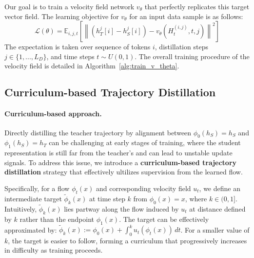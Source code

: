 \documentclass{article} %
\theoremstyle{definition}
\theoremstyle{remark}
\begin{document}
Our goal is to train a velocity field network $v_\theta$ that perfectly replicates this target vector field. The learning objective for $v_\theta$ for an input data sample is as follows:
\begin{equation}
\mathcal{L}(\theta) = \mathbb{E}_{i, j, t} \left[ \left\| \left(h_T^{j}[i] - h_S^{j}[i]\right) - v_\theta\left(H_t^{(i,j)}, t, j\right) \right\|^2 \right]
\end{equation}
The expectation is taken over sequence of tokens $i$, distillation steps $j \in \{1, ..., L_D\}$, and time steps $t \sim U(0,1)$. The overall training procedure of the velocity field is detailed in Algorithm~\ref{alg:train_v_theta}.
\subsection{Curriculum-based Trajectory Distillation}
\label{sec:distill}
\paragraph{Curriculum-based approach. }Directly distilling the teacher trajectory by alignment between $\phi_0(h_S) = h_S$ and $\phi_1(h_S) = h_T$ can be challenging at early stages of training, where the student representation is still far from the teacher's and can lead to unstable update signals. To address this issue, we introduce a \textbf{curriculum-based trajectory distillation} strategy that effectively ultilizes supervision from the learned flow.

Specifically, for a flow $\phi_t(x)$ and corresponding velocity field $u_t$, we define an intermediate target $\tilde{\phi}_k(x)$ at time step $k$ from $\phi_0(x) = x$, where $k \in (0, 1]$. Intuitively, $\tilde{\phi}_k(x)$ lies partway along the flow induced by $u_t$ at distance defined by $k$ rather than the endpoint $\phi_1(x)$. The target can be effectively approximated by: $\tilde{\phi}_k(x) := {\phi_0(x)} + \int_{0}^{k} u_t(\phi_t(x)) \, dt$. For a smaller value of $k$, the target is easier to follow, forming a curriculum that progressively increases in difficulty as training proceeds.
\end{document}
